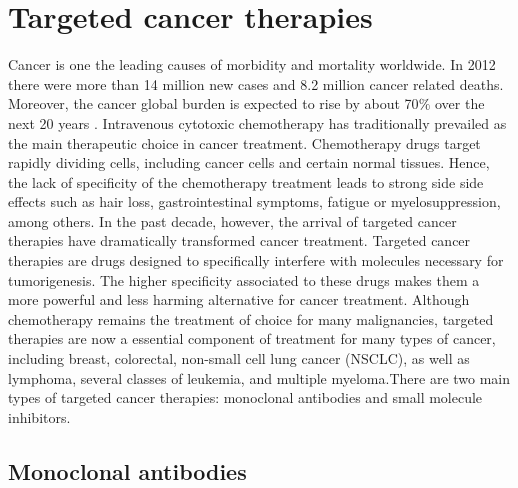 \documentclass[12pt, a4paper,twoside]{tesi_upf}
\begin{document}
\section{Targeted cancer therapies}

\par Cancer is one the leading causes of morbidity and mortality worldwide. In 2012 there were more than 14 million new cases and 8.2 million cancer related deaths. Moreover, the cancer global burden is expected to rise by about 70$\%$ over the next 20 years \cite{WHO_CANCER}. Intravenous cytotoxic chemotherapy has traditionally prevailed as the main therapeutic choice in cancer treatment. Chemotherapy drugs target rapidly dividing cells, including cancer cells and certain normal tissues.  Hence, the lack of specificity of the chemotherapy treatment leads to strong side side effects such as hair loss, gastrointestinal symptoms, fatigue or myelosuppression, among others.  In the past decade, however, the arrival of targeted cancer therapies have dramatically transformed cancer treatment. Targeted cancer therapies are drugs designed to specifically interfere with molecules necessary for tumorigenesis. The higher specificity associated to these drugs makes them a more powerful and less harming alternative for cancer treatment. Although chemotherapy remains the treatment of choice for many malignancies, targeted therapies are now a essential component of treatment for many types of cancer, including breast, colorectal, non-small cell lung cancer (NSCLC), as well as lymphoma, several classes of leukemia, and multiple myeloma.There are two main types of targeted cancer therapies:  monoclonal antibodies and small molecule inhibitors.

\subsection{Monoclonal antibodies}
\end{document}
